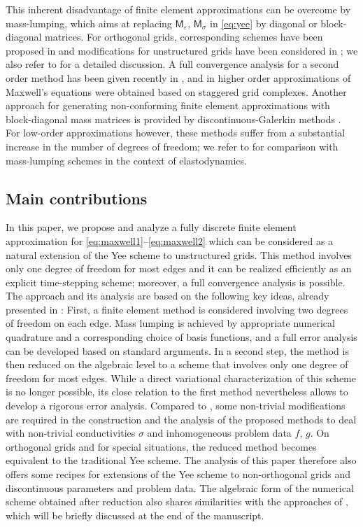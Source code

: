 \documentclass[12pt,reqno,a4paper]{amsart}
\theoremstyle{definition}
\def\ttM{\mathsf{M}}
\def\eps{\varepsilon}
\begin{document}
This inherent disadvantage of finite element approximations can be overcome by mass-lumping, which aims at replacing $\ttM_\eps$, $\ttM_\sigma$ in \eqref{eq:yee} by diagonal or block-diagonal matrices. For orthogonal grids, corresponding schemes have been proposed in \cite{CohenMonk95} and modifications for unstructured grids have been considered in \cite{ElmkiesJoly97b,ElmkiesJoly97}; we also refer to \cite{Cohen02} for a detailed discussion. A full convergence analysis for a second order method has been given recently in \cite{EggerRadu21a_maxwelltet,Radu22},  and in \cite{KapidaniCodecasaSchoberl21} higher order approximations of Maxwell's equations were obtained based on staggered grid complexes. 
Another approach for generating non-conforming finite element approximations with block-diagonal mass matrices is provided by discontinuous-Galerkin methods \cite{CohenPernet16,HesthavenWarburton08}. For low-order approximations however, these methods suffer from a substantial increase in the number of degrees of freedom; we refer to \cite{GeeversMulderVegt18} for comparison with mass-lumping schemes in the context of elastodynamics. 

\subsection*{Main contributions}
In this paper, we propose and analyze a fully discrete finite element approximation for \eqref{eq:maxwell1}--\eqref{eq:maxwell2} which can be considered as a natural extension of the Yee scheme to unstructured grids. This method involves only one degree of freedom for most edges and it can be realized efficiently as an explicit time-stepping scheme; moreover, a full convergence analysis is possible.
The approach and its analysis are based on the following key ideas, already presented in \cite{EggerRadu20c_maxwellyee}: 
First, a finite element method is considered involving two degrees of freedom on each edge. Mass lumping is achieved by appropriate numerical quadrature and a corresponding choice of basis functions, and a full error analysis can be developed based on standard arguments.
In a second step, the method is then reduced on the algebraic level to a scheme that involves only one degree of freedom for most edges. While a direct variational characterization of this scheme is no longer possible, its close relation to the first method nevertheless allows to develop a rigorous error analysis.
Compared to \cite{EggerRadu20c_maxwellyee}, some non-trivial modifications are required in the construction and the analysis of the proposed methods to deal with non-trivial conductivities $\sigma$ and inhomogeneous problem data $f$, $g$.
On orthogonal grids and for special situations, the reduced method becomes equivalent to the traditional Yee scheme. The analysis of this paper therefore also offers some recipes for extensions of the Yee scheme to non-orthogonal grids and discontinuous parameters and problem data.
The algebraic form of the numerical scheme obtained after reduction also shares similarities with the approaches of \cite{CodecasaKapidaniSpecognaTrevisan18,CodecasaPoliti08}, which will be briefly discussed at the end of the manuscript.  
\end{document}
